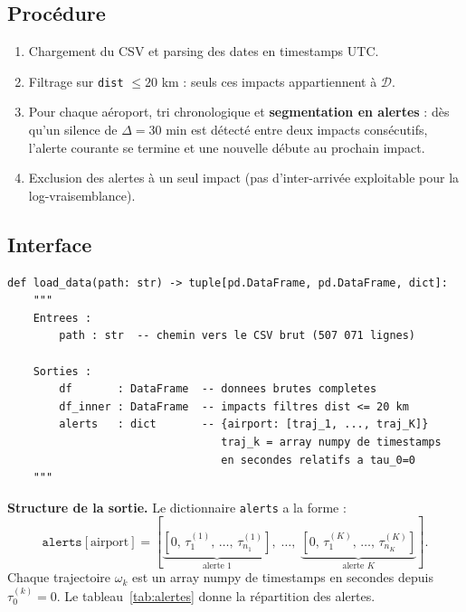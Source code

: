 \documentclass[a4paper,11pt]{article}
\begin{document}
\subsection{Procédure}

\begin{enumerate}
    \item Chargement du CSV et parsing des dates en timestamps UTC.
    \item Filtrage sur \texttt{dist} $\leq 20$ km : seuls ces impacts appartiennent à $\mathcal{D}$.
    \item Pour chaque aéroport, tri chronologique et \textbf{segmentation en alertes} : dès qu'un silence de $\Delta = 30$ min est détecté entre deux impacts consécutifs, l'alerte courante se termine et une nouvelle débute au prochain impact.
    \item Exclusion des alertes à un seul impact (pas d'inter-arrivée exploitable pour la log-vraisemblance).
\end{enumerate}

\subsection{Interface}

\begin{lstlisting}
def load_data(path: str) -> tuple[pd.DataFrame, pd.DataFrame, dict]:
    """
    Entrees :
        path : str  -- chemin vers le CSV brut (507 071 lignes)

    Sorties :
        df       : DataFrame  -- donnees brutes completes
        df_inner : DataFrame  -- impacts filtres dist <= 20 km
        alerts   : dict       -- {airport: [traj_1, ..., traj_K]}
                                 traj_k = array numpy de timestamps
                                 en secondes relatifs a tau_0=0
    """
\end{lstlisting}

\textbf{Structure de la sortie.} Le dictionnaire \texttt{alerts} a la forme :
\[
\texttt{alerts}[\text{airport}] = \left[ \underbrace{[0,\, \tau_1^{(1)},\, \ldots,\, \tau_{n_1}^{(1)}]}_{\text{alerte 1}},\; \ldots,\; \underbrace{[0,\, \tau_1^{(K)},\, \ldots,\, \tau_{n_K}^{(K)}]}_{\text{alerte }K} \right].
\]
Chaque trajectoire $\omega_k$ est un array numpy de timestamps en secondes depuis $\tau_0^{(k)} = 0$. Le tableau~\ref{tab:alertes} donne la répartition des alertes.
\end{document}
